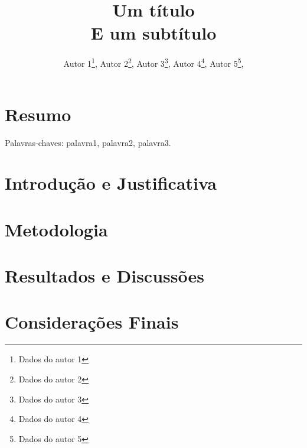 \documentclass[a4paper,12pt]{article}
\title{
	Um título\\
	E um subtítulo
}
\author{
	Autor 1\footnote{Dados do autor 1},
	Autor 2\footnote{Dados do autor 2},
	Autor 3\footnote{Dados do autor 3},
	Autor 4\footnote{Dados do autor 4},
	Autor 5\footnote{Dados do autor 5},
}
\date{}
\begin{document}
\maketitle
\thispagestyle{fancy}



\section*{\center Resumo}
\lipsum[1-2] %

Palavras-chaves: palavra1, palavra2, palavra3.



\onehalfspacing
\section*{\center Introdução e Justificativa}
\lipsum[1-10] %



\section*{\center Metodologia}
\lipsum[1-10] %



\section*{\center Resultados e Discussões}
\lipsum[1-10] %



\section*{\center Considerações Finais}
\lipsum[1-10] %
\end{document}
